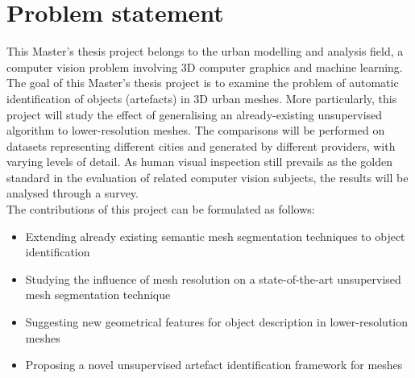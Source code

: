 \documentclass{kththesis}
\begin{document}
\section{Problem statement}
This Master's thesis project belongs to the urban modelling and analysis field, a computer vision problem involving 3D computer graphics and machine learning. 
The goal of this Master’s thesis project is to examine the problem of automatic identification of objects (artefacts) in 3D urban meshes. More particularly, this project will study the effect of generalising an already-existing unsupervised algorithm to lower-resolution meshes. The comparisons will be performed on datasets representing different cities and generated by different providers, with varying levels of detail. As human visual inspection still prevails as the golden standard in the evaluation of related computer vision subjects, the results will be analysed through a survey.   \\
The contributions of this project can be formulated as follows: 
\begin{itemize}
    \item Extending already existing semantic mesh segmentation techniques to object identification
    \item Studying the influence of mesh resolution on a state-of-the-art unsupervised mesh segmentation technique
    \item Suggesting new geometrical features for object description in lower-resolution meshes
    \item Proposing a novel unsupervised artefact identification framework for meshes
\end{itemize}
\end{document}
